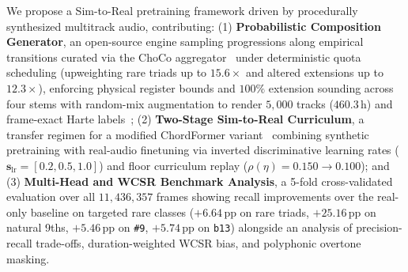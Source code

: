 We propose a Sim-to-Real pretraining framework driven by procedurally synthesized multitrack audio, contributing: (1) \textbf{Probabilistic Composition Generator}, an open-source engine sampling progressions along empirical transitions curated via the ChoCo aggregator~\cite{deberardinis2023choco} under deterministic quota scheduling (upweighting rare triads up to $15.6\times$ and altered extensions up to $12.3\times$), enforcing physical register bounds and $100\%$ extension sounding across four stems with random-mix augmentation to render $5{,}000$ tracks ($460.3\,\text{h}$) and frame-exact Harte labels~\cite{harte2005symbolic}; (2) \textbf{Two-Stage Sim-to-Real Curriculum}, a transfer regimen for a modified ChordFormer variant~\cite{akram2026chordformer} combining synthetic pretraining with real-audio finetuning via inverted discriminative learning rates ($\mathbf{s}_{\text{lr}} = [0.2, 0.5, 1.0]$) and floor curriculum replay ($\rho(\eta) = 0.150 \!\to\! 0.100$); and (3) \textbf{Multi-Head and WCSR Benchmark Analysis}, a 5-fold cross-validated evaluation over all $11{,}436{,}357$ frames showing recall improvements over the real-only baseline on targeted rare classes ($+6.64\,\text{pp}$ on rare triads, $+25.16\,\text{pp}$ on natural 9ths, $+5.46\,\text{pp}$ on {\small\texttt{\#9}}, $+5.74\,\text{pp}$ on {\small\texttt{b13}}) alongside an analysis of precision-recall trade-offs, duration-weighted WCSR bias, and polyphonic overtone masking.
